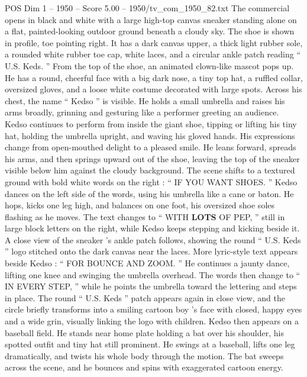 \begin{textsample}{POS Dim 1 – 1950 – Score 5.00 – 1950/tv\_com\_1950\_82.txt}  \label{ex:f1_pos_084}
The commercial opens in black and white with a large high-top canvas sneaker standing alone on a flat, painted-looking outdoor ground beneath a cloudy sky.
The shoe is shown in profile, toe pointing right.
It has a dark canvas upper, a thick light rubber sole, a rounded white rubber toe cap, white laces, and a circular ankle patch reading “ U.S.
Keds. ” From the top of the shoe, an animated clown-like mascot pops up.
He has a round, cheerful face with a big dark nose, a tiny top hat, a ruffled collar, oversized gloves, and a loose white costume decorated with large spots.
Across his chest, the name “ Kedso ” is visible.
He holds a small umbrella and raises his arms broadly, grinning and gesturing like a performer greeting an audience.
Kedso continues to perform from inside the giant shoe, tipping or lifting his tiny hat, holding the umbrella upright, and waving his gloved hands.
His expressions change from open-mouthed delight to a pleased smile.
He leans forward, spreads his arms, and then springs upward out of the shoe, leaving the top of the sneaker visible below him against the cloudy background.
The scene shifts to a textured ground with bold white words on the right : “ IF YOU WANT SHOES. ” Kedso dances on the left side of the words, using his umbrella like a cane or baton.
He hops, kicks one leg high, and balances on one foot, his oversized shoe soles flashing as he moves.
The text changes to “ WITH \textbf{LOTS} OF PEP, ” still in large block letters on the right, while Kedso keeps stepping and kicking beside it.
A close view of the sneaker ’s ankle patch follows, showing the round “ U.S.
Keds ” logo stitched onto the dark canvas near the laces.
More lyric-style text appears beside Kedso : “ FOR BOUNCE AND ZOOM. ” He continues a jaunty dance, lifting one knee and swinging the umbrella overhead.
The words then change to “ IN EVERY STEP, ” while he points the umbrella toward the lettering and steps in place.
The round “ U.S.
Keds ” patch appears again in close view, and the circle briefly transforms into a smiling cartoon boy ’s face with closed, happy eyes and a wide grin, visually linking the logo with children.
Kedso then appears on a baseball field.
He stands near home plate holding a bat over his shoulder, his spotted outfit and tiny hat still prominent.
He swings at a baseball, lifts one leg dramatically, and twists his whole body through the motion.
The bat sweeps across the scene, and he bounces and spins with exaggerated cartoon energy.

\end{textsample}
